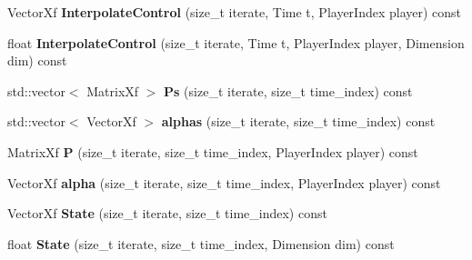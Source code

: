 \begin{DoxyCompactItemize}
\item 
Vector\+Xf {\bfseries Interpolate\+Control} (size\+\_\+t iterate, Time t, Player\+Index player) const \hypertarget{classilqgames_1_1_solver_log_ac7d6053a5764889fca2ec5cf5a462988}{}\label{classilqgames_1_1_solver_log_ac7d6053a5764889fca2ec5cf5a462988}

\item 
float {\bfseries Interpolate\+Control} (size\+\_\+t iterate, Time t, Player\+Index player, Dimension dim) const \hypertarget{classilqgames_1_1_solver_log_af8fd1063450f96fa3e5029bc07b5b39b}{}\label{classilqgames_1_1_solver_log_af8fd1063450f96fa3e5029bc07b5b39b}

\item 
std\+::vector$<$ Matrix\+Xf $>$ {\bfseries Ps} (size\+\_\+t iterate, size\+\_\+t time\+\_\+index) const \hypertarget{classilqgames_1_1_solver_log_a5429c067fefb9d902be11cb881247a81}{}\label{classilqgames_1_1_solver_log_a5429c067fefb9d902be11cb881247a81}

\item 
std\+::vector$<$ Vector\+Xf $>$ {\bfseries alphas} (size\+\_\+t iterate, size\+\_\+t time\+\_\+index) const \hypertarget{classilqgames_1_1_solver_log_ae4725b1be8df5cb17312e8bb27bf1954}{}\label{classilqgames_1_1_solver_log_ae4725b1be8df5cb17312e8bb27bf1954}

\item 
Matrix\+Xf {\bfseries P} (size\+\_\+t iterate, size\+\_\+t time\+\_\+index, Player\+Index player) const \hypertarget{classilqgames_1_1_solver_log_a0bf49939b8e4b940067bf2157c621c93}{}\label{classilqgames_1_1_solver_log_a0bf49939b8e4b940067bf2157c621c93}

\item 
Vector\+Xf {\bfseries alpha} (size\+\_\+t iterate, size\+\_\+t time\+\_\+index, Player\+Index player) const \hypertarget{classilqgames_1_1_solver_log_a0234745c13f7426545dcf37ef759f7e3}{}\label{classilqgames_1_1_solver_log_a0234745c13f7426545dcf37ef759f7e3}

\item 
Vector\+Xf {\bfseries State} (size\+\_\+t iterate, size\+\_\+t time\+\_\+index) const \hypertarget{classilqgames_1_1_solver_log_a54b12edccfcfca015670cd6405b1b527}{}\label{classilqgames_1_1_solver_log_a54b12edccfcfca015670cd6405b1b527}

\item 
float {\bfseries State} (size\+\_\+t iterate, size\+\_\+t time\+\_\+index, Dimension dim) const \hypertarget{classilqgames_1_1_solver_log_a448f9cd63c6b6e889cb8791bc1902305}{}\label{classilqgames_1_1_solver_log_a448f9cd63c6b6e889cb8791bc1902305}


\end{DoxyCompactItemize}
